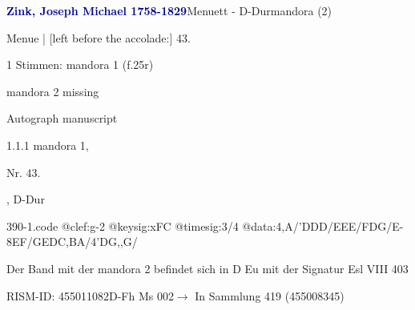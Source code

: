 \documentclass[twocolumn]{book}
\begin{document}
\par \vspace{7pt} \textcolor{darkblue}{\textbf{Zink, Joseph Michael  1758-1829}}\hfillplus{\textbf{[390]}}\newline Menuett - D-Dur\newline mandora (2)
\par \begin{itshape}[f.25r, at left:] Menue | [left before the accolade:] 43.\end{itshape} 
\par \textcolor{darkblue}{}  1 Stimmen: mandora 1  (f.25r)\newline \begin{small} mandora 2 missing\end{small} \newline Autograph manuscript
\par 1.1.1  mandora 1, \begin{itshape}Nr. 43.\end{itshape}, D-Dur  
\begin{filecontents*}{390-1.code}
@clef:g-2
@keysig:xFC
@timesig:3/4
@data:4,A/'DDD/EEE/FDG/E-{8EF}/{GE}{DC}{,BA}/4'DG,,G/
\end{filecontents*}
\newline
%
\par Der Band mit der mandora 2 befindet sich in D Eu mit der Signatur Esl VIII 403
\par RISM-ID: 455011082\newline D-Fh  Ms 002\newline $\rightarrow$ In Sammlung 419 (455008345)
      
\end{document}
